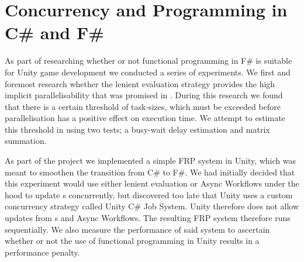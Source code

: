 \chapter{Concurrency and Programming in C\# and F\#}
As part of researching whether or not functional programming in F\# is suitable for Unity game development we conducted a series of experiments. We first and foremost research whether the lenient evaluation strategy provides the high implicit parallelisability that was promised in \cite{DBLP:journals/cl/Tremblay-parallel}. During this research we found that there is a certain threshold of task-sizes, which must be exceeded before parallelisation has a positive effect on execution time. We attempt to estimate this threshold in  using two tests; a busy-wait delay estimation and matrix summation.

As part of the project we implemented a simple \gls{FRP} system in Unity, which was meant to smoothen the transition from C\# to F\#. We had initially decided that this experiment would use either lenient evaluation or Async Workflows under the hood to update s concurrently, but discovered too late that Unity uses a custom concurrency strategy called Unity C\# Job System\cite{unity:csharp:job:system}. Unity therefore does not allow  updates from s and Async Workflows\cite{unity:async}. The resulting \gls{FRP} system therefore runs sequentially. We also measure the performance of said system to ascertain whether or not the use of functional programming in Unity results in a performance penalty. 




